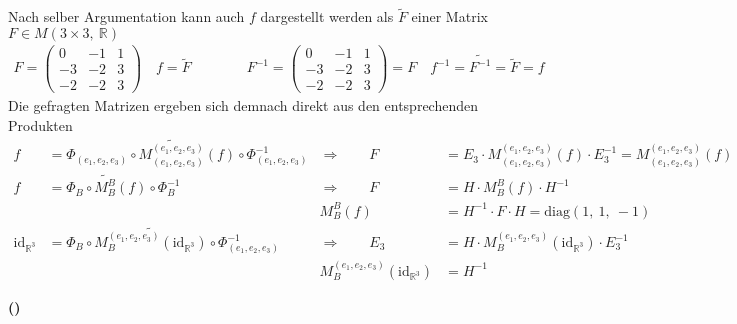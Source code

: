\documentclass[a4paper, 12pt]{scrartcl}
\newcounter{taski}
\newcounter{taskii}[taski]
\newcommand{\ttask}{\stepcounter{taskii}\textbf{(\alph{taskii})}}
\begin{document}
Nach selber Argumentation kann auch $f$ dargestellt werden als $\widetilde{F}$ einer Matrix $F \in M(3 \times 3,\ \mathbb{R})$
\begin{gather*}
    F = \begin{pmatrix} 0 & -1 & 1 \\ -3 & -2 & 3 \\ -2 & -2 & 3 \end{pmatrix} \quad f = \widetilde{F} \qquad \qquad F^{-1} = \begin{pmatrix} 0 & -1 & 1 \\ -3 & -2 & 3 \\ -2 & -2 & 3 \end{pmatrix} = F \quad f^{-1} = \widetilde{F^{-1}} = \widetilde{F} = f
\end{gather*}
Die gefragten Matrizen ergeben sich demnach direkt aus den entsprechenden Produkten
\begin{align*}
    f &= \Phi_{(e_1,e_2,e_3)} \circ \widetilde{M_{(e_1,e_2,e_3)}^{(e_1,e_2,e_3)}}(f) \circ \Phi_{{(e_1,e_2,e_3)}}^{-1}
    &\Longrightarrow \qquad
    F &= E_3 \cdot M_{(e_1,e_2,e_3)}^{(e_1,e_2,e_3)}(f) \cdot E_3^{-1} = M_{(e_1,e_2,e_3)}^{(e_1,e_2,e_3)}(f) \\
    f &= \Phi_{B} \circ \widetilde{M_{B}^{B}}(f) \circ \Phi_{{B}}^{-1}
    &\Longrightarrow \qquad
    F &= H \cdot M_B^B(f) \cdot H^{-1} \\
    && M_B^B(f) &= H^{-1} \cdot F \cdot H = \mathrm{diag}(1,\ 1,\ -1) \\
    \mathrm{id}_{\mathbb{R}^3} &= \Phi_B \circ \widetilde{M^{(e_1,e_2,e_3)}_B(\mathrm{id}_{\mathbb{R}^3})} \circ \Phi_{(e_1,e_2,e_3)}^{-1}
    &\Longrightarrow \qquad
    E_3 &= H \cdot M^{(e_1,e_2,e_3)}_B(\mathrm{id}_{\mathbb{R}^3}) \cdot E_3^{-1} \\
    && M^{(e_1,e_2,e_3)}_B(\mathrm{id}_{\mathbb{R}^3}) &= H^{-1}
\end{align*}

\ttask
\end{document}
